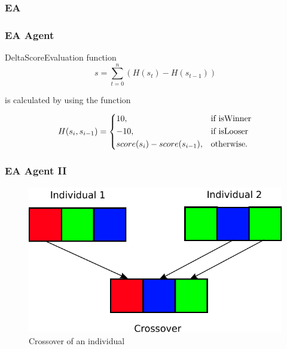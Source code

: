 \documentclass{beamer}
\begin{document}
\begin{frame}
\frametitle{EA}


\end{frame}





\begin{frame}
\frametitle{EA Agent}

DeltaScoreEvaluation function 
\begin{equation*}
s = \sum_{t=0}^n (H(s_t) - H(s_{t-1}))
\end{equation*}

is calculated by using the function

\begin{equation*}
    H(s_i, s_{i-1}) = 
\begin{dcases}
    10, & \text{if isWinner}  \\
    -10, & \text{if isLooser}  \\
    score(s_i) - score(s_{i-1}), & \text{otherwise.}
\end{dcases}
\end{equation*}
\end{frame}



\begin{frame}
\frametitle{EA Agent II}
\begin{figure}[H]
\centering
\includegraphics[scale=0.6]{../report/images/crossover.pdf}
\caption{Crossover of an individual}
\label{fig:crossover}
\end{figure}
\end{frame}
\end{document}
